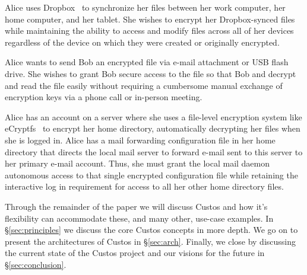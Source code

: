 \begin{packed_desc}
\item[Secure Multi-Devices Access:] Alice uses Dropbox~\cite{dropbox} to
  synchronize her files between her work computer, her home computer,
  and her tablet. She wishes to encrypt her Dropbox-synced files
  while maintaining the ability to access and modify files across all
  of her devices regardless of the device on which they were created
  or originally encrypted.
\item[Secure Out-of-Band Sharing:] Alice wants to send Bob an
  encrypted file via e-mail attachment or USB flash drive. She wishes
  to grant Bob secure access to the file so that Bob and decrypt and
  read the file easily without requiring a cumbersome manual exchange
  of encryption keys via a phone call or in-person meeting.
\item[Secure Autonomous Access:] Alice has an account on a server
  where she uses a file-level encryption system like
  eCryptfs~\cite{eCryptfs} to encrypt her home directory,
  automatically decrypting her files when she is logged in. Alice has
  a mail forwarding configuration file in her home directory that
  directs the local mail server to forward e-mail sent to this server
  to her primary e-mail account. Thus, she must grant the local mail
  daemon autonomous access to that single encrypted configuration file
  while retaining the interactive log in requirement for access to all
  her other home directory files.
\end{packed_desc}

Through the remainder of the paper we will discuss Custos and how it's
flexibility can accommodate these, and many other, use-case
examples. In \S \ref{sec:principles} we discuss the core Custos
concepts in more depth. We go on to present the architectures of
Custos in \S \ref{sec:arch}. Finally, we close by discussing the
current state of the Custos project and our visions for the future in
\S \ref{sec:conclusion}.
